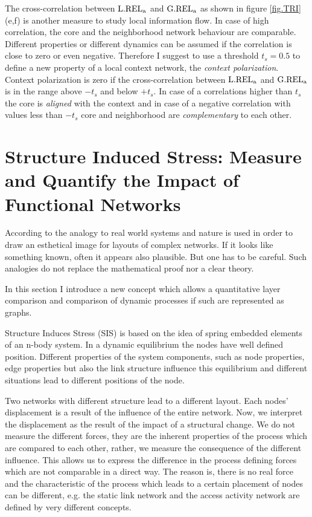 \documentclass[a4paper,10pt]{scrbook}
\begin{document}
The cross-correlation between $\rm L.REL_a$ and $\rm G.REL_a$ as shown in figure \ref{fig.TRI}(e,f) is another
measure to study local information flow. In case of high correlation, the core and the neighborhood network behaviour are comparable. Different properties or different dynamics can be assumed if the correlation is close to zero or even negative.
Therefore I suggest to use a threshold $t_s = 0.5$ to define a new property of a local context network, the \textit{context polarization}. Context polarization is zero if the cross-correlation between $\rm L.REL_a$ and $\rm G.REL_a$ is in the range above $-t_s$ and below $+t_s$. In case of a correlations higher than $t_s$ the core is \textit{aligned} with the context and in case of a negative correlation with values less than $-t_s$ core and neighborhood are \textit{complementary} to each other.  


\chapter{Structure Induced Stress: Measure and Quantify the Impact of Functional Networks}
\label{StructureInducedStress}

 
According to \cite{Fruchterman1991} the analogy to real world systems and nature is used  in order to draw an esthetical image for layouts of complex networks. If it looks like something known, often it appears also plausible. But one has to be careful. Such analogies do not replace the mathematical proof nor a clear theory. 

In this section I introduce a new concept which allows a quantitative layer comparison and comparison of dynamic processes if such are represented as graphs. 

Structure Induces Stress (SIS) is based on the idea of spring embedded elements of an n-body system. In a dynamic equilibrium the nodes have well defined position. Different properties of the system components, such as node properties, edge properties but also the link structure influence this equilibrium and different situations lead to different positions of the node.

\label{ext.fig.StructureInducedStress} 


Two networks with different structure lead to a different layout. Each nodes' displacement is a result of the influence of the entire network. Now, we interpret the displacement as the result of the impact of a structural change. We do not measure the different forces, they are the inherent properties of the process which are compared to each other, rather, we measure the consequence of the different influence. This allows us to express the difference in the process defining forces which are not comparable in a direct way. The reason is, there is no real force and the characteristic of the process which leads to a certain placement of nodes can be different, e.g. the static link network and the access activity network are defined by very different concepts. 
\end{document}
